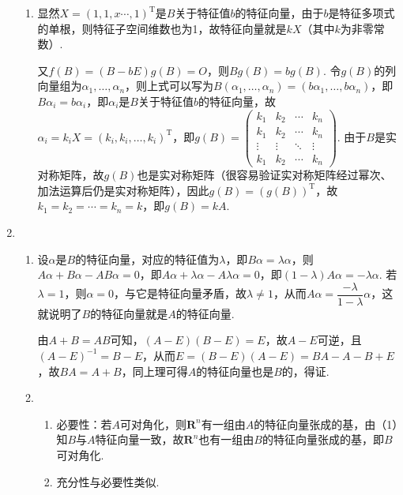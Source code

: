 \begin{enumerate}
\begin{enumerate}
              \item 显然$X=(1,1,x\cdots,1)^\mathrm{T}$是$B$关于特征值$b$的特征向量，由于$b$是特征多项式的单根，则特征子空间维数也为1，故特征向量就是$kX$（其中$k$为非零常数）.

                    又$f(B)=(B-bE)g(B)=O$，则$Bg(B)=bg(B)$. 令$g(B)$的列向量组为$\alpha_1,\ldots,\alpha_n$，则上式可以写为$B(\alpha_1,\ldots,\alpha_n)=(b\alpha_1,\ldots,b\alpha_n)$，即$B\alpha_i=b\alpha_i$，即$\alpha_i$是$B$关于特征值$b$的特征向量，故$\alpha_i=k_iX=(k_i,k_i,\ldots,k_i)^{\mathrm{T}}$，即$g(B)=\begin{pmatrix}
                            k_1 & k_2 & \cdots & k_n \\ k_1 & k_2 & \cdots & k_n \\ \vdots & \vdots & \ddots & \vdots \\ k_1 & k_2 & \cdots & k_n
                        \end{pmatrix}$. 由于$B$是实对称矩阵，故$g(B)$也是实对称矩阵（很容易验证实对称矩阵经过幂次、加法运算后仍是实对称矩阵），因此$g(B)=(g(B))^\mathrm{T}$，故$k_1=k_2=\cdots=k_n=k$，即$g(B)=kA$.
          \end{enumerate}

    \item \begin{enumerate}
              \item 设$\alpha$是$B$的特征向量，对应的特征值为$\lambda$，即$B\alpha=\lambda\alpha$，则$A\alpha+B\alpha-AB\alpha=0$，即$A\alpha+\lambda\alpha-A\lambda\alpha=0$，即$(1-\lambda)A\alpha=-\lambda\alpha$. 若$\lambda=1$，则$\alpha=0$，与它是特征向量矛盾，故$\lambda\neq 1$，从而$A\alpha=\dfrac{-\lambda}{1-\lambda}\alpha$，这就说明了$B$的特征向量就是$A$的特征向量.

                    由$A+B=AB$可知，$(A-E)(B-E)=E$，故$A-E$可逆，且$(A-E)^{-1}=B-E$，从而$E=(B-E)(A-E)=BA-A-B+E$，故$BA=A+B$，同上理可得$A$的特征向量也是$B$的，得证.

              \item \begin{enumerate}
                        \item 必要性：若$A$可对角化，则$\mathbf{R}^n$有一组由$A$的特征向量张成的基，由（1）知$B$与$A$特征向量一致，故$\mathbf{R}^n$也有一组由$B$的特征向量张成的基，即$B$可对角化.

                        \item 充分性与必要性类似.
                    \end{enumerate}


\end{enumerate}
\end{enumerate}
